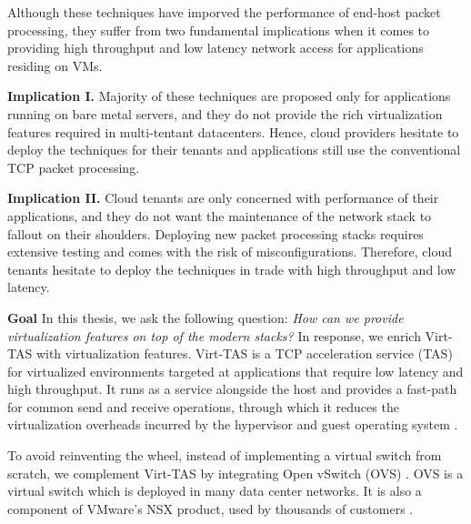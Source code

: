 Although these techniques have imporved the performance of end-host packet processing, they 
suffer from two fundamental implications when it comes to providing high throughput and 
low latency network access for applications residing on VMs.


\textbf{Implication I.} Majority of these techniques are proposed only for applications running
on bare metal servers, and they do not provide the rich virtualization features required in 
multi-tentant datacenters. Hence, cloud providers hesitate to deploy the techniques for
their tenants and applications still use the conventional TCP packet processing.

\textbf{Implication II.} Cloud tenants are only concerned with performance of their applications,
and they do not want the maintenance of the network stack to fallout on their shoulders. Deploying 
new packet processing stacks requires extensive testing and comes with the risk of 
misconfigurations. Therefore, cloud tenants hesitate to deploy the techniques in trade with
high throughput and low latency.

\textbf{Goal} In this thesis, we ask the following question: \emph{How can we provide virtualization 
features on top of the modern stacks?} In response, we enrich Virt-TAS with virtualization features.
Virt-TAS is a TCP acceleration service (TAS) for virtualized environments targeted at applications 
that require low latency and high throughput. It runs as a service alongside the host and provides 
a fast-path for common send and receive operations, through which it reduces the virtualization 
overheads incurred by the hypervisor and guest operating system \cite{florian2021virttas}. 

To avoid reinventing the wheel, instead of implementing a virtual switch from scratch, we
complement Virt-TAS by integrating Open vSwitch (OVS) \cite{pfaff2015design}. OVS is a virtual
switch which is deployed in many data center networks. It is also a component of VMware's NSX 
product, used by thousands of customers \cite{tu2021revisiting}.


